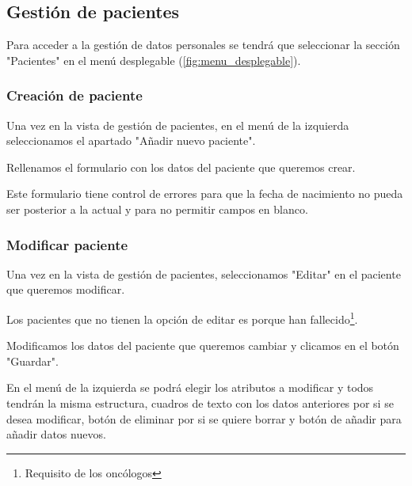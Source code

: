 \subsection{Gestión de pacientes}

Para acceder a la gestión de datos personales se tendrá que seleccionar la sección "Pacientes"{} en el menú desplegable (\ref{fig:menu_desplegable}).


\subsubsection{Creación de paciente}

Una vez en la vista de gestión de pacientes, en el menú de la izquierda seleccionamos el apartado "{}Añadir nuevo paciente".


Rellenamos el formulario con los datos del paciente que queremos crear.


Este formulario tiene control de errores para que la fecha de nacimiento no pueda ser posterior a la actual y para no permitir campos en blanco.

\subsubsection{Modificar paciente}

Una vez en la vista de gestión de pacientes, seleccionamos "{}Editar"{} en el paciente que queremos modificar.

Los pacientes que no tienen la opción de editar es porque han fallecido\footnote{Requisito de los oncólogos}.


Modificamos los datos del paciente que queremos cambiar y clicamos en el botón "{}Guardar". 


En el menú de la izquierda se podrá elegir los atributos a modificar y todos tendrán la misma estructura, cuadros de texto con los datos anteriores por si se desea modificar, botón de eliminar por si se quiere borrar y botón de añadir para añadir datos nuevos.

